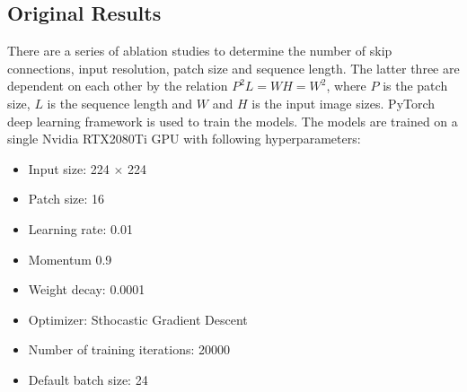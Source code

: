 \documentclass{IEEEtran}
\begin{document}
\vfill\null\newpage

\begin{table}[h]
\end{table}

\subsection{Original Results \cite{chen2021transunet}}

There are a series of ablation studies to determine the number of skip connections, input resolution, patch size and sequence length. The latter three are dependent on each other by the relation $P^2L = WH = W^2$, where $P$ is the patch size, $L$ is the sequence length and $W$ and $H$ is the input image sizes.
PyTorch \cite{paszke2017automatic} deep learning framework is used to train the models.
The models are trained on a single Nvidia RTX2080Ti GPU with following hyperparameters:
\begin{itemize}
    \item Input size: 224 $\times$ 224
    \item Patch size: 16
    \item Learning rate: 0.01
    \item Momentum 0.9 
    \item Weight decay: 0.0001
    \item Optimizer: Sthocastic Gradient Descent
    \item Number of training iterations: 20000
    \item Default batch size: 24
\end{itemize}
\end{document}
